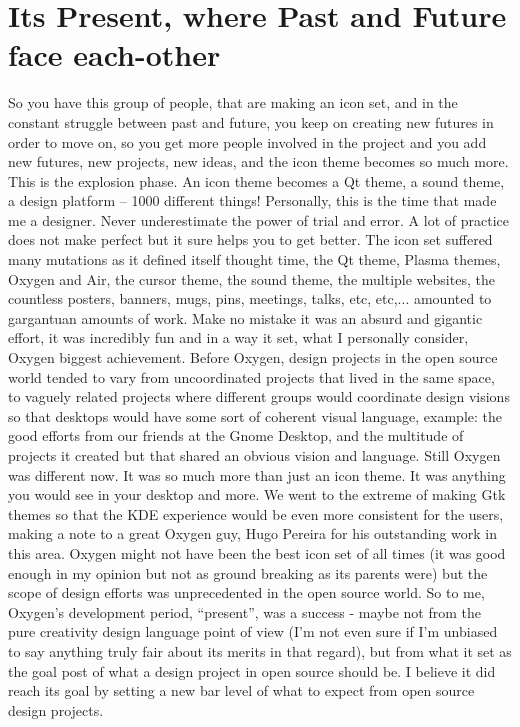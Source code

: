 \section*{Its Present, where Past and Future face each-other}
So you have this group of people, that are making an icon set, and in the constant struggle between past and future, you keep on creating new futures in order to move on, so you get more people involved in the project and you add new futures, new projects, new ideas, and the icon theme becomes so much more. This is the explosion phase. An icon theme becomes a Qt theme, a sound theme, a design platform – 1000 different things!
Personally, this is the time that made me a designer. Never underestimate the power of trial and error. A lot of practice does not make perfect but it sure helps you to get better.
The icon set suffered many mutations as it defined itself thought time, the Qt theme, Plasma themes, Oxygen and Air, the cursor theme, the sound theme, the multiple websites, the countless posters, banners, mugs, pins, meetings, talks, etc, etc,... amounted to gargantuan amounts of work. 
Make no mistake it was an absurd and gigantic effort, it was incredibly fun and in a way it set, what I personally consider, Oxygen biggest achievement.
Before Oxygen, design projects in the open source world tended to vary from uncoordinated projects that lived in the same space, to vaguely related projects where different groups would coordinate design visions so that desktops would have some sort of coherent visual language, example: the good efforts from our friends at the Gnome Desktop, and the multitude of projects it created but that shared an obvious vision and language.
Still Oxygen was different now. It was so much more than just an icon theme. It was anything you would see in your desktop and more. We went to the extreme of making Gtk themes so that the KDE experience would be even more consistent for the users, making a note to a great Oxygen guy, Hugo Pereira for his outstanding work in this area.
Oxygen might not have been the best icon set of all times (it was good enough in my opinion but not as ground breaking as its parents were) but the scope of design efforts was unprecedented in the open source world. 
So to me, Oxygen's development period, “present”,  was a success - maybe not from the pure creativity design language point of view (I'm not even sure if I'm unbiased to say anything truly fair about its merits in that regard), but from what it set as the goal post of what a design project in open source should be. I believe it did reach its goal by setting a new bar level of what to expect from open source design projects.

